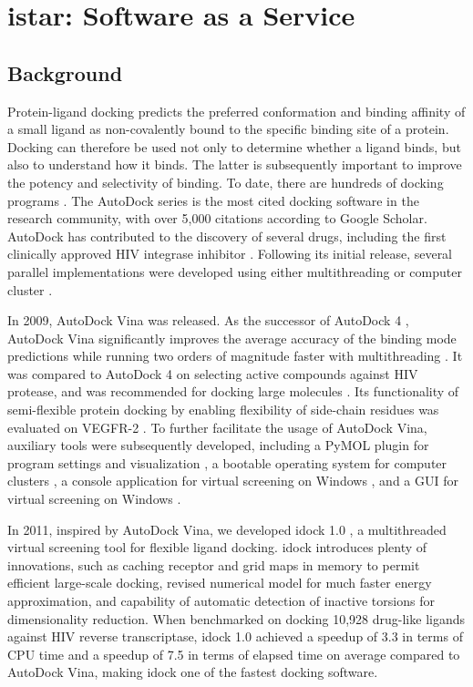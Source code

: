 \chapter{istar: Software as a Service}

\section{Background}

Protein-ligand docking predicts the preferred conformation and binding affinity of a small ligand as non-covalently bound to the specific binding site of a protein. Docking can therefore be used not only to determine whether a ligand binds, but also to understand how it binds. The latter is subsequently important to improve the potency and selectivity of binding. To date, there are hundreds of docking programs \cite{493,922}. The AutoDock series \cite{597,596,595} is the most cited docking software in the research community, with over 5,000 citations according to Google Scholar. AutoDock has contributed to the discovery of several drugs, including the first clinically approved HIV integrase inhibitor \cite{1169}. Following its initial release, several parallel implementations were developed using either multithreading or computer cluster \cite{115,560,782}.

In 2009, AutoDock Vina \cite{595} was released. As the successor of AutoDock 4 \cite{596}, AutoDock Vina significantly improves the average accuracy of the binding mode predictions while running two orders of magnitude faster with multithreading \cite{595}. It was compared to AutoDock 4 on selecting active compounds against HIV protease, and was recommended for docking large molecules \cite{556}. Its functionality of semi-flexible protein docking by enabling flexibility of side-chain residues was evaluated on VEGFR-2 \cite{1084}. To further facilitate the usage of AutoDock Vina, auxiliary tools were subsequently developed, including a PyMOL \cite{1221} plugin for program settings and visualization \cite{609}, a bootable operating system for computer clusters \cite{773}, a console application for virtual screening on Windows \cite{1268}, and a GUI for virtual screening on Windows \cite{1250}.

In 2011, inspired by AutoDock Vina, we developed idock 1.0 \cite{1153}, a multithreaded virtual screening tool for flexible ligand docking. idock introduces plenty of innovations, such as caching receptor and grid maps in memory to permit efficient large-scale docking, revised numerical model for much faster energy approximation, and capability of automatic detection of inactive torsions for dimensionality reduction. When benchmarked on docking 10,928 drug-like ligands against HIV reverse transcriptase, idock 1.0 achieved a speedup of 3.3 in terms of CPU time and a speedup of 7.5 in terms of elapsed time on average compared to AutoDock Vina, making idock one of the fastest docking software.

